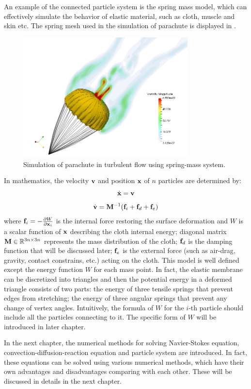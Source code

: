 An example of the connected particle system is the spring mass model, which can effectively simulate the behavior of elastic material, such as cloth\cite{Baraff1998Large}, muscle \cite{NedelReal1998} and skin\cite{GelderApproximate1998} etc. The spring mesh used in the simulation of parachute is displayed in . 
\begin{figure}
\centering
\includegraphics[width=0.8\textwidth]{Figures/parachute_turb.jpg} 
\caption{Simulation of parachute in turbulent flow using spring-mass system.} 
\label{fig:spring_mesh}
\end{figure}
In mathematics, the velocity $\mathbf{v}$ and position $\mathbf{x}$ of $n$ particles are determined by:
\begin{equation}
\dot{\mathbf{x}} = \mathbf{v}
\label{spring_x_eqn}
\end{equation}
\begin{equation}
\dot{\mathbf{v}} = \mathbf{M}^{-1}(\mathbf{f}_i
				+ \mathbf{f}_d + \mathbf{f}_e \label{spring_v_eqn})
\end{equation}
where $\mathbf{f}_i = -\frac{\partial W}{\partial \mathbf{x}_i}$ is the internal force restoring the surface deformation and $W$ is a scalar function of $\mathbf{x}$ describing the cloth internal energy; diagonal matrix $\mathbf{M} \in \mathbb{R}^{3n\times 3n}$ represents the mass distribution of the cloth; $\mathbf{f}_d$ is the damping function that will be discussed later; $\mathbf{f}_e$ is the external force (such as air-drag, gravity, contact constrains, etc.) acting on the cloth. This model is well defined except the energy function $W$ for each mass point. In fact, the elastic membrane can be discretized into triangles and then the potential energy in a deformed triangle consists of two parts: the energy of three tensile springs that prevent edges from stretching; the energy of three angular springs that prevent any change of vertex angles. Intuitively, the formula of $W$ for the $i$-th particle should include all the particles connecting to it. The specific form of $W$ will be introduced in later chapter.

In the next chapter, the numerical methods for solving Navier-Stokes equation, convection-diffusion-reaction equation and particle system are introduced. In fact, these equations can be solved using various numerical methods, which have their own advantages and disadvantages comparing with each other. These will be discussed in details in the next chapter.
